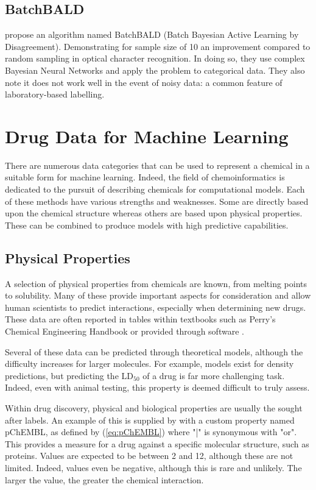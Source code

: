 \subsection{BatchBALD}
\textcite{BatchBALD} propose an algorithm named BatchBALD (Batch Bayesian Active Learning by Disagreement). Demonstrating for sample size of 10 an improvement compared to random sampling in optical character recognition. In doing so, they use complex Bayesian Neural Networks and apply the problem to categorical data. They also note it does not work well in the event of noisy data: a common feature of laboratory-based labelling.

\section{Drug Data for Machine Learning}
There are numerous data categories that can be used to represent a chemical in a suitable form for machine learning. Indeed, the field of chemoinformatics is dedicated to the pursuit of describing chemicals for computational models. Each of these methods have various strengths and weaknesses. Some are directly based upon the chemical structure whereas others are based upon physical properties. These can be combined to produce models with high predictive capabilities.

\subsection{Physical Properties}
A selection of physical properties from chemicals are known, from melting points to solubility. Many of these provide important aspects for consideration and allow human scientists to predict interactions, especially when determining new drugs. These data are often reported in tables within textbooks such as Perry's Chemical Engineering Handbook or provided through software \cite{CHEMBL,Perrys}.

Several of these data can be predicted through theoretical models, although the difficulty increases for larger molecules. For example, models exist for density predictions, but predicting the $\mathrm{LD_{50}}$ of a drug is  far more challenging task. Indeed, even with animal testing, this property is deemed difficult to truly assess.

Within drug discovery, physical and biological properties are usually the sought after labels. An example of this is supplied by \textcite{CHEMBL} with a custom property named pChEMBL, as defined by (\ref{eq:pChEMBL}) where "|" is synonymous with "or". This provides a measure for a drug against a specific molecular structure, such as proteins. Values are expected to be between 2 and 12, although these are not limited. Indeed, values even be negative, although this is rare and unlikely. The larger the value, the greater the chemical interaction.

